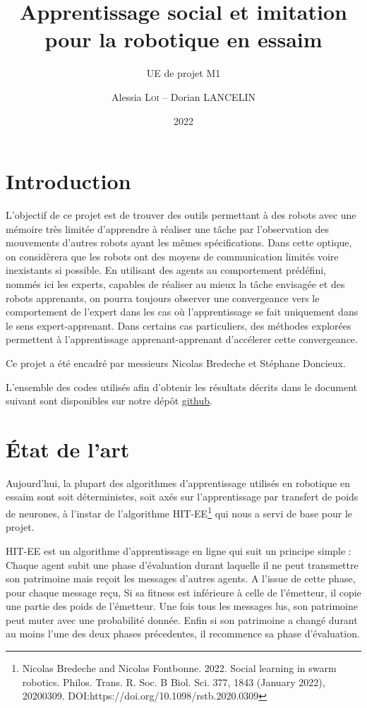 \documentclass[a4paper, 12pt]{report}
\institute{Sorbonne Université}
\title{Apprentissage social et imitation pour la robotique en essaim}
\subtitle{UE de projet M1}
\author{Alessia \textsc{Loi} -- Dorian \textsc{LANCELIN}}
\date{2022}
\begin{document}
    \maketitle
    \romantableofcontents

    \chapter{Introduction}
	L'objectif de ce projet est de trouver des outils permettant à des robots avec une mémoire très limitée d'apprendre à réaliser une tâche par l'observation des mouvements d'autres robots ayant les mêmes spécifications.
Dans cette optique, on considèrera que les robots ont des moyens de communication limités voire inexistants si possible.
En utilisant des agents au comportement prédéfini, nommés ici les experts, capables de réaliser au mieux la tâche envisagée et des robots apprenants, on pourra toujours observer une convergeance vers le comportement de l'expert dans les cas où l'apprentissage se fait uniquement dans le sens expert-apprenant.
    Dans certains cas particuliers, des méthodes explorées permettent à l'apprentissage apprenant-apprenant d'accélerer cette convergeance. 
    
    Ce projet a été encadré par messieurs Nicolas Bredeche et Stéphane Doncieux.  
    
    L'ensemble des codes utilisés afin d'obtenir les résultats décrits dans le document suivant sont disponibles sur notre dépôt \href{https://github.com/aerrynn/M1_Projet_ASIRE}{github}. 

    \chapter{État de l'art}
    Aujourd'hui, la plupart des algorithmes d'apprentissage utilisés en robotique en essaim sont soit déterministes, soit axés sur l'apprentissage par transfert de poids de neurones, à l'instar de l'algorithme HIT-EE\footnote{Nicolas Bredeche and Nicolas Fontbonne. 2022. Social learning in swarm robotics. Philos. Trans. R. Soc. B Biol. Sci. 377, 1843 (January 2022), 20200309. DOI:https://doi.org/10.1098/rstb.2020.0309} qui nous a servi de base pour le projet.
    
    HIT-EE est un algorithme d'apprentissage en ligne qui suit un principe simple : Chaque agent subit une phase d'évaluation durant laquelle il ne peut transmettre son patrimoine mais reçoit les messages d'autres agents. A l'issue de cette phase, pour chaque message reçu, Si sa fitness est inférieure à celle de l'émetteur, il copie une partie des poids de l'émetteur. Une fois tous les messages lus, son patrimoine peut muter avec une probabilité donnée. Enfin si son patrimoine a changé durant au moins l'une des deux phases précedentes, il recommence sa phase d'évaluation.
    
\end{document}
